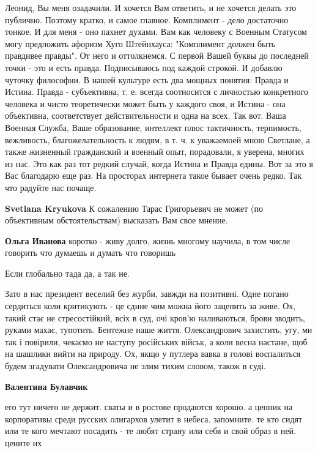 \begin{multicols}{2}
Леонид, Вы меня озадачили. И хочется Вам ответить, и не хочется делать это
публично. Поэтому кратко, и самое главное. Комплимент - дело достаточно тонкое.
И для меня - оно пахнет духами. Вам как человеку с Военным Статусом могу
предложить афоризм Хуго Штейнхауса: "Комплимент должен быть правдивее правды".
От него и оттолкнемся. С первой Вашей буквы до последней точки - это и есть
правда. Подписываюсь под каждой строкой. И добавлю чуточку философии. В нашей
культуре есть два мощных понятия: Правда и Истина. Правда - субъективна, т. е.
всегда соотносится с личностью конкретного человека и чисто теоретически может
быть у каждого своя, и Истина - она объективна, соответствует действительности
и одна на всех. Так вот. Ваша Военная Служба, Ваше образование, интеллект плюс
тактичность, терпимость, вежливость, благожелательность к людям, в т. ч. к
уважаемоей мною Светлане, а также жизненный гражданский и военный опыт,
порадовали, я уверена, многих из нас. Это как раз тот редкий случай, когда
Истина и Правда едины. Вот за это я Вас благодарю еще раз. На просторах
интернета такое бывает очень редко. Так что радуйте нас почаще.


\textbf{Svetlana Kryukova} К сожалению Тарас Григорьевич не может (по объективным обстоятельствам) высказать Вам свое мнение.

\textbf{Ольга Иванова} коротко - живу долго, жизнь многому научила, в том числе говорить что думаешь и думать что говоришь

Если глобально тада да, а так не.


Зато в нас президент веселий без журби, завжди на позитивні. Одне погано
сердиться коли критикують - це єдине чим можна його зацепить за живе. Ох, такий
стає не стресостійкий, всіх в суд, очі кров'ю наливаються, брови зводить,
руками махає, тупотить. Бентежне наше життя. Олександрович захистить, угу, ми
так і повірили, чекаємо не наступу російських військ, а коли весна настане, щоб
на шашлики вийти на природу. Ох, якщо у путлера вавка в голові воспалиться
будем згадувати Олександровича не злим тихим словом, також в суді.

\textbf{Валентина Булавчик} 

его тут ничего не держит. сваты и в ростове продаются хорошо. а ценник на
корпоративы среди русских олигархов улетит в небеса. запомните. те кто сидят
или те кого мечтают посадить - те любят страну или себя и свой образ в ней.
цените их


\end{multicols}
